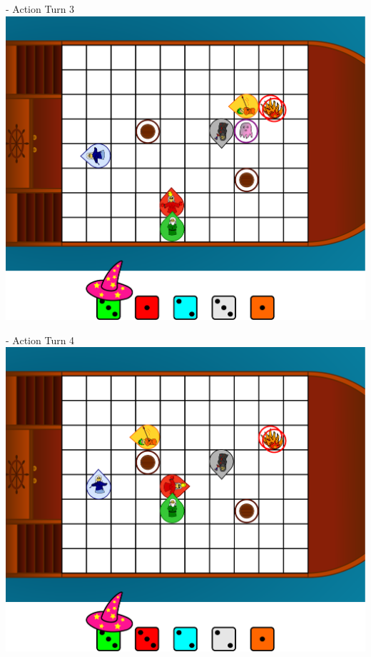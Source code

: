 \documentclass[presentation]{beamer}
\begin{document}
\begin{frame}{\insertsection - Action Turn 3}
	\center
	\includegraphics[width=\textheight]{ingame_sketch_3.pdf}
\end{frame}

\begin{frame}{\insertsection - Action Turn 4}
	\center
	\includegraphics[width=\textheight]{ingame_sketch_4.pdf}
\end{frame}
\end{document}
